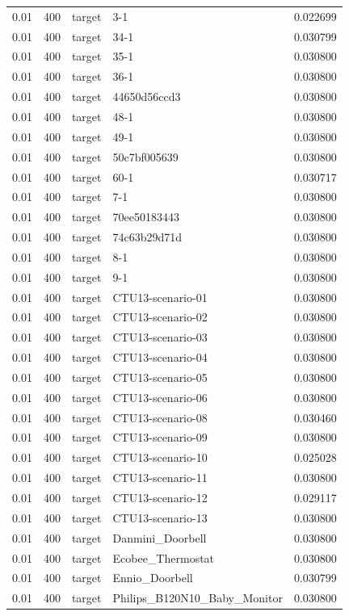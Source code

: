 \begin{tabular}{lllll}
0.01 & 400 & target & 3-1 & 0.022699 \\
0.01 & 400 & target & 34-1 & 0.030799 \\
0.01 & 400 & target & 35-1 & 0.030800 \\
0.01 & 400 & target & 36-1 & 0.030800 \\
0.01 & 400 & target & 44650d56ccd3 & 0.030800 \\
0.01 & 400 & target & 48-1 & 0.030800 \\
0.01 & 400 & target & 49-1 & 0.030800 \\
0.01 & 400 & target & 50c7bf005639 & 0.030800 \\
0.01 & 400 & target & 60-1 & 0.030717 \\
0.01 & 400 & target & 7-1 & 0.030800 \\
0.01 & 400 & target & 70ee50183443 & 0.030800 \\
0.01 & 400 & target & 74c63b29d71d & 0.030800 \\
0.01 & 400 & target & 8-1 & 0.030800 \\
0.01 & 400 & target & 9-1 & 0.030800 \\
0.01 & 400 & target & CTU13-scenario-01 & 0.030800 \\
0.01 & 400 & target & CTU13-scenario-02 & 0.030800 \\
0.01 & 400 & target & CTU13-scenario-03 & 0.030800 \\
0.01 & 400 & target & CTU13-scenario-04 & 0.030800 \\
0.01 & 400 & target & CTU13-scenario-05 & 0.030800 \\
0.01 & 400 & target & CTU13-scenario-06 & 0.030800 \\
0.01 & 400 & target & CTU13-scenario-08 & 0.030460 \\
0.01 & 400 & target & CTU13-scenario-09 & 0.030800 \\
0.01 & 400 & target & CTU13-scenario-10 & 0.025028 \\
0.01 & 400 & target & CTU13-scenario-11 & 0.030800 \\
0.01 & 400 & target & CTU13-scenario-12 & 0.029117 \\
0.01 & 400 & target & CTU13-scenario-13 & 0.030800 \\
0.01 & 400 & target & Danmini\_Doorbell & 0.030800 \\
0.01 & 400 & target & Ecobee\_Thermostat & 0.030800 \\
0.01 & 400 & target & Ennio\_Doorbell & 0.030799 \\
0.01 & 400 & target & Philips\_B120N10\_Baby\_Monitor & 0.030800 \\

\end{tabular}
